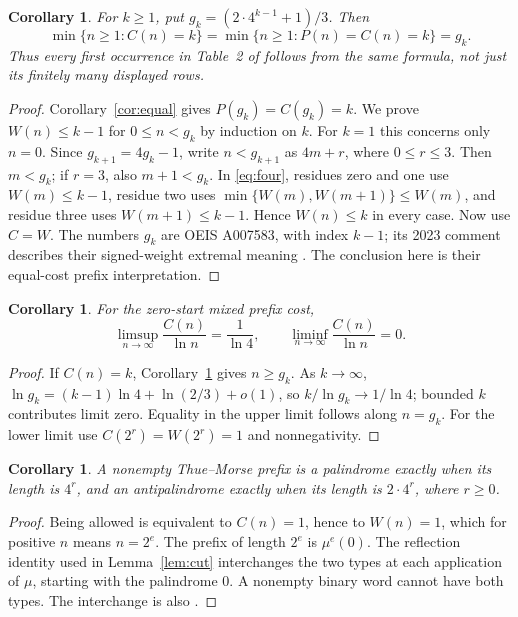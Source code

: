 \documentclass[11pt]{article}
\newtheorem{corollary}[theorem]{Corollary}
\begin{document}
\begin{corollary}\label{cor:first}
For $k\geq1$, put $g_k=(2\cdot4^{k-1}+1)/3$. Then
\[
 \min\{n\geq1:C(n)=k\}
 =\min\{n\geq1:P(n)=C(n)=k\}=g_k.
\]
Thus every first occurrence in Table~2 of \cite{AKMP} follows from the
same formula, not just its finitely many displayed rows.
\end{corollary}
\begin{proof}
Corollary~\ref{cor:equal} gives $P(g_k)=C(g_k)=k$.
We prove $W(n)\leq k-1$ for $0\leq n<g_k$ by induction on $k$.
For $k=1$ this concerns only $n=0$.
Since $g_{k+1}=4g_k-1$, write $n<g_{k+1}$ as $4m+r$,
where $0\leq r\leq3$. Then $m<g_k$; if $r=3$, also $m+1<g_k$.
In \eqref{eq:four}, residues zero and one use $W(m)\leq k-1$,
residue two uses $\min\{W(m),W(m+1)\}\leq W(m)$,
and residue three uses $W(m+1)\leq k-1$.
Hence $W(n)\leq k$ in every case. Now use $C=W$.
The numbers $g_k$ are OEIS A007583, with index $k-1$; its 2023
comment describes their signed-weight extremal meaning \cite{OEIS}.
The conclusion here is their equal-cost prefix interpretation.
\end{proof}

\begin{corollary}\label{cor:growth}
For the zero-start mixed prefix cost,
\[
 \limsup_{n\to\infty}\frac{C(n)}{\ln n}=\frac1{\ln4},
 \qquad \liminf_{n\to\infty}\frac{C(n)}{\ln n}=0.
\]
\end{corollary}
\begin{proof}
If $C(n)=k$, Corollary~\ref{cor:first} gives $n\geq g_k$.
As $k\to\infty$, $\ln g_k=(k-1)\ln4+\ln(2/3)+o(1)$,
so $k/\ln g_k\to1/\ln4$; bounded $k$ contributes limit zero.
Equality in the upper limit follows along $n=g_k$.
For the lower limit use $C(2^r)=W(2^r)=1$ and nonnegativity.
\end{proof}

\begin{corollary}\label{cor:types}
A nonempty Thue--Morse prefix is a palindrome exactly when its length
is $4^r$, and an antipalindrome exactly when its length is $2\cdot4^r$,
where $r\geq0$.
\end{corollary}
\begin{proof}
Being allowed is equivalent to $C(n)=1$, hence to $W(n)=1$,
which for positive $n$ means $n=2^e$.
The prefix of length $2^e$ is $\mu^e(0)$.
The reflection identity used in Lemma~\ref{lem:cut} interchanges the
two types at each application of $\mu$, starting with the palindrome $0$.
A nonempty binary word cannot have both types.
The interchange is also \cite[Observation~1(iv)--(v)]{AMP}.
\end{proof}
\end{document}
